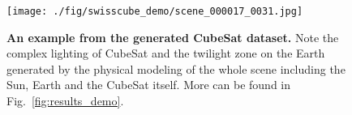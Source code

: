 
\begin{figure}[t]
    \begin{center}
    \texttt{[image: ./fig/swisscube\_demo/scene\_000017\_0031.jpg]}
    \end{center}
    \vspace{-6mm}
    \caption{{\bf An example from the generated CubeSat dataset.} Note the complex lighting of CubeSat and the twilight zone on the Earth generated by the physical modeling of the whole scene including the Sun, Earth and the CubeSat itself. More can be found in Fig.~\ref{fig:results_demo}.}
    \label{fig:render_setting}
\end{figure}
